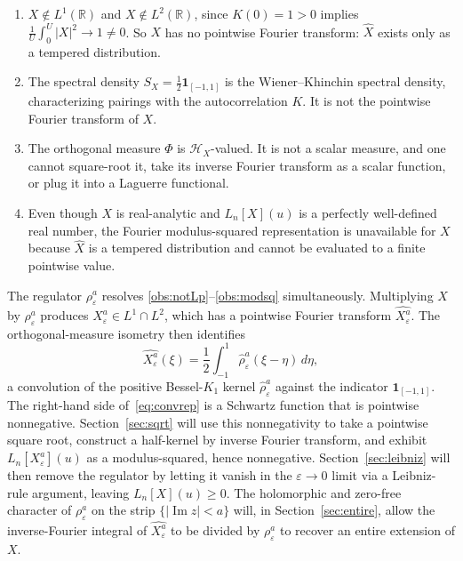 \documentclass[12pt]{amsart}
\theoremstyle{remark}
\begin{document}
\begin{enumerate}
\label{list:obstructions}
\item\label{obs:notLp} $X \notin L^1(\mathbb{R})$ and $X \notin
  L^2(\mathbb{R})$, since $K(0) = 1 > 0$ implies
  $\frac{1}{U}\int_0^U |X|^2 \to 1 \neq 0$.  So $X$ has no pointwise
  Fourier transform: $\widehat{X}$ exists only as a tempered
  distribution.

\item\label{obs:spectral} The spectral density
  $S_X = \tfrac{1}{2}\mathbf{1}_{[-1,1]}$ is the Wiener--Khinchin
  spectral density, characterizing pairings with the autocorrelation
  $K$.  It is not the pointwise Fourier transform of $X$.

\item\label{obs:Phi} The orthogonal measure $\Phi$ is
  $\mathcal{H}_X$-valued.  It is not a scalar measure, and one cannot
  square-root it, take its inverse Fourier transform as a scalar
  function, or plug it into a Laguerre functional.

\item\label{obs:modsq} Even though $X$ is real-analytic and
  $L_n[X](u)$ is a perfectly well-defined real number, the Fourier
  modulus-squared representation is unavailable for $X$ because
  $\widehat{X}$ is a tempered distribution and cannot be evaluated to
  a finite pointwise value.
\end{enumerate}

The regulator $\rho_\varepsilon^a$ resolves
\eqref{obs:notLp}--\eqref{obs:modsq} simultaneously.  Multiplying $X$
by $\rho_\varepsilon^a$ produces $X_\varepsilon^a \in L^1 \cap L^2$,
which has a pointwise Fourier transform $\widehat{X_\varepsilon^a}$.
The orthogonal-measure isometry then identifies
\begin{equation}\label{eq:convrep}
  \widehat{X_\varepsilon^a}(\xi)
  = \frac{1}{2}\int_{-1}^{1}
      \hat{\rho}_\varepsilon^a(\xi - \eta)\, d\eta,
\end{equation}
a convolution of the positive Bessel-$K_1$ kernel
$\hat{\rho}_\varepsilon^a$ against the indicator
$\mathbf{1}_{[-1,1]}$.  The right-hand side of~\eqref{eq:convrep} is a
Schwartz function that is pointwise nonnegative.
Section~\ref{sec:sqrt} will use this nonnegativity to take a pointwise
square root, construct a half-kernel by inverse Fourier transform, and
exhibit $L_n[X_\varepsilon^a](u)$ as a modulus-squared, hence
nonnegative.  Section~\ref{sec:leibniz} will then remove the regulator
by letting it vanish in the $\varepsilon \to 0$ limit via a
Leibniz-rule argument, leaving $L_n[X](u) \geq 0$.  The holomorphic
and zero-free character of $\rho_\varepsilon^a$ on the strip
$\{|\operatorname{Im} z| < a\}$ will, in Section~\ref{sec:entire},
allow the inverse-Fourier integral of $\widehat{X_\varepsilon^a}$ to
be divided by $\rho_\varepsilon^a$ to recover an entire extension of
$X$.
\end{document}
